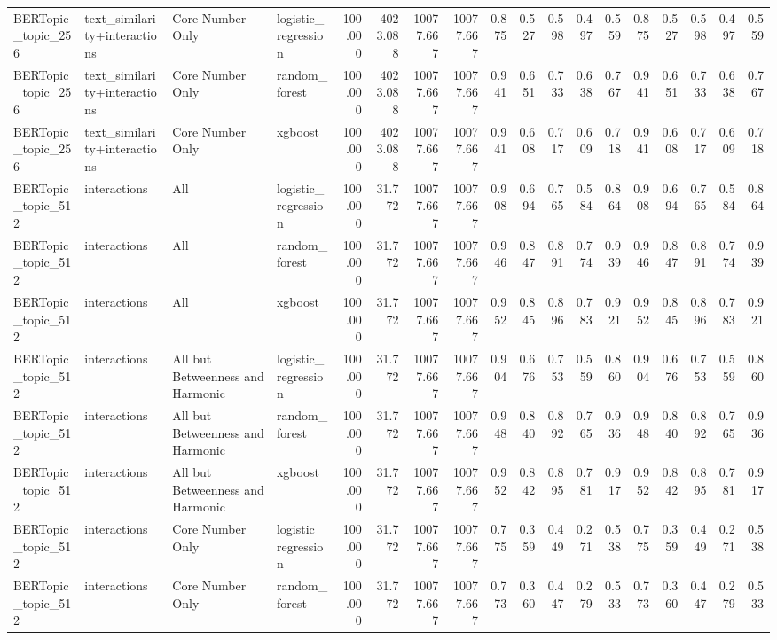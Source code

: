 \begin{tabular}{llllrrrrrrrrrrrrrr}
BERTopic_topic_256 & text_similarity+interactions & Core Number Only & logistic_regression & 100.000 & 4023.088 & 10077.667 & 10077.667 & 0.875 & 0.527 & 0.598 & 0.497 & 0.559 & 0.875 & 0.527 & 0.598 & 0.497 & 0.559 \\
BERTopic_topic_256 & text_similarity+interactions & Core Number Only & random_forest & 100.000 & 4023.088 & 10077.667 & 10077.667 & 0.941 & 0.651 & 0.733 & 0.638 & 0.767 & 0.941 & 0.651 & 0.733 & 0.638 & 0.767 \\
BERTopic_topic_256 & text_similarity+interactions & Core Number Only & xgboost & 100.000 & 4023.088 & 10077.667 & 10077.667 & 0.941 & 0.608 & 0.717 & 0.609 & 0.718 & 0.941 & 0.608 & 0.717 & 0.609 & 0.718 \\
BERTopic_topic_512 & interactions & All & logistic_regression & 100.000 & 31.772 & 10077.667 & 10077.667 & 0.908 & 0.694 & 0.765 & 0.584 & 0.864 & 0.908 & 0.694 & 0.765 & 0.584 & 0.864 \\
BERTopic_topic_512 & interactions & All & random_forest & 100.000 & 31.772 & 10077.667 & 10077.667 & 0.946 & 0.847 & 0.891 & 0.774 & 0.939 & 0.946 & 0.847 & 0.891 & 0.774 & 0.939 \\
BERTopic_topic_512 & interactions & All & xgboost & 100.000 & 31.772 & 10077.667 & 10077.667 & 0.952 & 0.845 & 0.896 & 0.783 & 0.921 & 0.952 & 0.845 & 0.896 & 0.783 & 0.921 \\
BERTopic_topic_512 & interactions & All but Betweenness and Harmonic & logistic_regression & 100.000 & 31.772 & 10077.667 & 10077.667 & 0.904 & 0.676 & 0.753 & 0.559 & 0.860 & 0.904 & 0.676 & 0.753 & 0.559 & 0.860 \\
BERTopic_topic_512 & interactions & All but Betweenness and Harmonic & random_forest & 100.000 & 31.772 & 10077.667 & 10077.667 & 0.948 & 0.840 & 0.892 & 0.765 & 0.936 & 0.948 & 0.840 & 0.892 & 0.765 & 0.936 \\
BERTopic_topic_512 & interactions & All but Betweenness and Harmonic & xgboost & 100.000 & 31.772 & 10077.667 & 10077.667 & 0.952 & 0.842 & 0.895 & 0.781 & 0.917 & 0.952 & 0.842 & 0.895 & 0.781 & 0.917 \\
BERTopic_topic_512 & interactions & Core Number Only & logistic_regression & 100.000 & 31.772 & 10077.667 & 10077.667 & 0.775 & 0.359 & 0.449 & 0.271 & 0.538 & 0.775 & 0.359 & 0.449 & 0.271 & 0.538 \\
BERTopic_topic_512 & interactions & Core Number Only & random_forest & 100.000 & 31.772 & 10077.667 & 10077.667 & 0.773 & 0.360 & 0.447 & 0.279 & 0.533 & 0.773 & 0.360 & 0.447 & 0.279 & 0.533 \\

\end{tabular}
